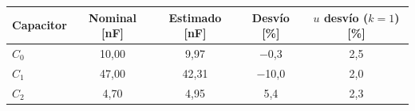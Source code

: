 \begin{tabular}{@{}lcccc@{}}
\toprule
Capacitor & Nominal [nF] & Estimado [nF] & Desvío [\%] & $u$ desvío ($k=1$) [\%] \\
\midrule
$C_0$ & 10{,}00 & 9{,}97 & $-$0{,}3 & 2{,}5 \\
$C_1$ & 47{,}00 & 42{,}31 & $-$10{,}0 & 2{,}0 \\
$C_2$ & 4{,}70 & 4{,}95 & 5{,}4 & 2{,}3 \\
\bottomrule
\end{tabular}